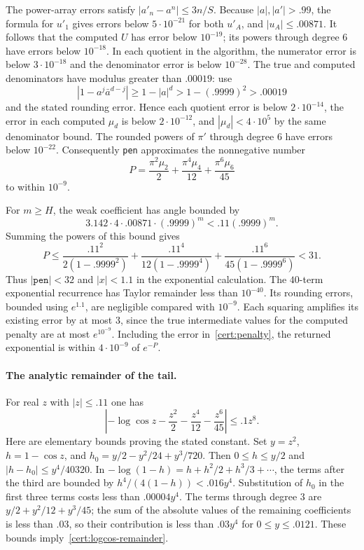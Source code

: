 The power-array errors satisfy $|a'_n-a^n|\le3n/S$.  Because
$|a|,|a'|>.99$, the formula for $u'_1$ gives errors below
$5\cdot10^{-21}$ for both $u'_A$, and $|u_A|\le.00871$.
It follows that the computed $U$ has error below $10^{-19}$;
its powers through degree $6$ have errors below $10^{-18}$.
In each quotient in the algorithm, the numerator error is below
$3\cdot10^{-18}$ and the denominator error is below $10^{-28}$.
The true and computed denominators have modulus greater than
$.00019$: use
\[
 |1-a^j\bar a^{d-j}|\ge1-|a|^d
 >1-(.9999)^2>.00019
\]
and the stated rounding error.  Hence each quotient error is below
$2\cdot10^{-14}$, the error in each computed $\mu_d$ is below
$2\cdot10^{-12}$, and $|\mu_d|<4\cdot10^5$ by the same denominator
bound.  The rounded powers of $\pi'$ through degree $6$ have errors
below $10^{-22}$.  Consequently \texttt{pen} approximates the
nonnegative number
\begin{equation}\label{cert:penalty}
 P=\frac{\pi^2\mu_2}{2}+\frac{\pi^4\mu_4}{12}
       +\frac{\pi^6\mu_6}{45}
\end{equation}
to within $10^{-9}$.

For $m\ge H$, the weak coefficient has angle bounded by
\[
 3.142\cdot4\cdot.00871\cdot(.9999)^m
 <.11(.9999)^m.
\]
Summing the powers of this bound gives
\[
 P\le\frac{.11^2}{2(1-.9999^2)}
      +\frac{.11^4}{12(1-.9999^4)}
      +\frac{.11^6}{45(1-.9999^6)}<31.
\]
Thus $|\texttt{pen}|<32$ and $|x|<1.1$ in the exponential
calculation.  The $40$-term exponential recurrence has Taylor
remainder less than $10^{-40}$.  Its rounding errors, bounded using
$e^{1.1}$, are negligible compared with $10^{-9}$.  Each squaring
amplifies its existing error by at most $3$, since the true
intermediate values for the computed penalty are at most
$e^{10^{-9}}$.  Including the error in~\eqref{cert:penalty}, the
returned exponential is within $4\cdot10^{-9}$ of $e^{-P}$.

\paragraph{The analytic remainder of the tail.}
For real $z$ with $|z|\le.11$ one has
\begin{equation}\label{cert:logcos-remainder}
 \left| -\log\cos z-\frac{z^2}{2}-\frac{z^4}{12}
                         -\frac{z^6}{45}\right|\le.1z^8.
\end{equation}
Here are elementary bounds proving the stated constant.  Set
$y=z^2$, $h=1-\cos z$, and
$h_0=y/2-y^2/24+y^3/720$.  Then $0\le h\le y/2$ and
$|h-h_0|\le y^4/40320$.  In
$-\log(1-h)=h+h^2/2+h^3/3+\cdots$, the terms after the third
are bounded by $h^4/(4(1-h))<.016y^4$.  Substitution of $h_0$
in the first three terms costs less than $.00004y^4$.
The terms through degree $3$ are $y/2+y^2/12+y^3/45$;
the sum of the absolute values of the remaining coefficients is
less than $.03$, so their contribution is less than $.03y^4$
for $0\le y\le.0121$.  These bounds imply~\eqref{cert:logcos-remainder}.

